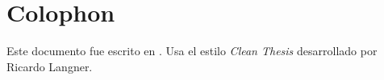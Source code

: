 %
\pagestyle{empty}
\hfill
\vfill
{}
\section*{Colophon}

Este documento fue escrito en \LaTeXe. Usa el estilo \textit{Clean Thesis} desarrollado por Ricardo Langner.